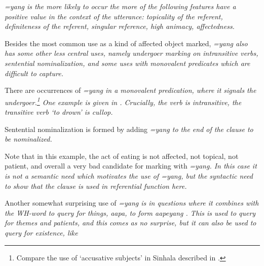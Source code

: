 \ea\label{ex:form:yang:rule}
\em  \em=yang \em is the more likely to occur the more of the following features have a positive value in the context of the utterance: topicality of the referent, definiteness of the referent, singular reference, high animacy, affectedness.\em
\z

Besides the most common use as a kind of affected object marked, \em =yang \em also has some other less central uses, namely undergoer marking on intransitive verbs, sentential nominalization, and some uses with monovalent predicates which are difficult to capture.


There are occurrences of \em =yang \em in a monovalent predication, where it signals the undergoer.\footnote{Compare the use of `accusative subjects' in Sinhala described in \citep{Gair1976sinhalasubject,Gair1991infl}.} One example is given in . Crucially, the verb  is intransitive, the transitive verb `to drown' is \em cullop\em.




Sentential nominalization is formed by adding \em =yang \em to the end of the clause to be nominalized.


Note that in this example, the act of eating is not affected, not topical, not patient, and overall a very bad candidate for marking with \em =yang\em. In this case it is not a semantic need which motivates the use of \em =yang\em, but the syntactic need to show that the clause is used in referential function here.

Another somewhat surprising use of \em =yang \em is in questions where it combines with the WH-word to query for things, \em aapa\em, to form \em aapeyang \em {}. This is used to query for themes and patients, and this comes as no surprise, but it can also be used to query for existence, like 

